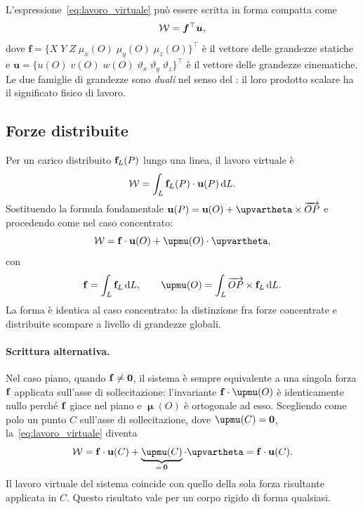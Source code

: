\begin{oss}
	L'espressione~\eqref{eq:lavoro_virtuale} può essere
	scritta in forma compatta come
	\begin{equation}
		\mathcal{W} = \bm{f}^\top \bm{u},
	\end{equation}
	dove
	$\bm{f} = \{X\; Y\; Z\;
	\mu_x(O)\; \mu_y(O)\; \mu_z(O)\}^\top$
	è il vettore delle grandezze statiche e
	$\bm{u} = \{u(O)\; v(O)\; w(O)\;
	\vartheta_x\; \vartheta_y\; \vartheta_z\}^\top$
	è il vettore delle grandezze cinematiche. Le due
	famiglie di grandezze sono \textit{duali} nel senso del
	: il loro prodotto
	scalare ha il significato fisico di lavoro.
\end{oss}

\subsection{Forze distribuite}

Per un carico distribuito $\mathbf{f}_L(P)$ lungo una linea, il
lavoro virtuale è
\begin{equation}
	\mathcal{W} = \int_L \mathbf{f}_L(P) \cdot \mathbf{u}(P)\,\mathrm{d} L.
\end{equation}
Sostituendo la formula fondamentale
$\ub(P) = \ub(O) + \bm{\upvartheta} \times
\overrightarrow{OP}$ e procedendo come nel caso concentrato:
\begin{equation}
	\Wc = \fb \cdot \ub(O)
	+ \bm{\upmu}(O) \cdot \bm{\upvartheta},
\end{equation}
con
\begin{equation}
	\fb = \int_L \fb_L\,\dd L, \qquad
	\bm{\upmu}(O) = \int_L \overrightarrow{OP}
	\times \fb_L\,\dd L.
\end{equation}
La forma è identica al caso concentrato: la distinzione
fra forze concentrate e distribuite scompare a livello
di grandezze globali.


\paragraph{Scrittura alternativa.}
Nel caso piano, quando $\mathbf{f} \neq \mathbf{0}$, il sistema è
sempre equivalente a una singola forza $\mathbf{f}$ applicata
sull'asse di sollecitazione: l'invariante
$\fb \cdot \bm{\upmu}(O)$ è identicamente nullo perché
$\mathbf{f}$ giace nel piano e $\bm{\upmu}(O)$ è ortogonale ad
esso. Scegliendo come polo un punto $C$ sull'asse di
sollecitazione, dove $\bm{\upmu}(C) = \zerovb$,
la~\eqref{eq:lavoro_virtuale} diventa
\begin{equation}\label{eq:lavoro_risultante}
	\Wc = \fb \cdot \ub(C) +
	\underbrace{\bm{\upmu}(C)}_{=\,\zerovb}
	\cdot \bm{\upvartheta}
	= \fb \cdot \ub(C).
\end{equation}
Il lavoro virtuale del sistema coincide con quello della
sola forza risultante applicata in $C$. Questo risultato
vale per un corpo rigido di forma qualsiasi.

